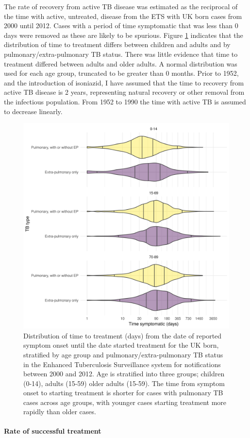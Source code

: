 \documentclass[11pt,twoside]{bristolthesis}
\begin{document}
  The rate of recovery from active TB disease was estimated as the reciprocal of the time with active, untreated, disease from the ETS with UK born cases from 2000 until 2012. Cases with a period of time symptomatic that was less than 0 days were removed as these are likely to be spurious. Figure \ref{fig:tb-time-treat} indicates that the distribution of time to treatment differs between children and adults and by pulmonary/extra-pulmonary TB status. There was little evidence that time to treatment differed between adults and older adults. A normal distribution was used for each age group, truncated to be greater than 0 months. Prior to 1952, and the introduction of isoniazid, I have assumed that the time to recovery from active TB disease is 2 years, representing natural recovery or other removal from the infectious population. From 1952 to 1990 the time with active TB is assumed to decrease linearly.
  \begin{figure}
  
  {\centering \includegraphics[width=0.8\linewidth]{chapters/model-development/resources/figure/time_to_treatment} 
  
  }
  
  \caption{Distribution of time to treatment (days) from the date of reported symptom onset until the date started treatment for the UK born, stratified by age group and pulmonary/extra-pulmonary TB status in the Enhanced Tuberculosis Surveillance system for notifications between 2000 and 2012. Age is stratified into three groups; children (0-14), adults (15-59) older adults (15-59). The time from symptom onset to starting treatment is shorter for cases with pulmonary TB cases across age groups, with younger cases starting treatment more rapidly than older cases.}\label{fig:tb-time-treat}
  \end{figure}
  \hypertarget{rate-of-successful-treatment}{%
  \paragraph{Rate of successful treatment}\label{rate-of-successful-treatment}}
  
\end{document}
